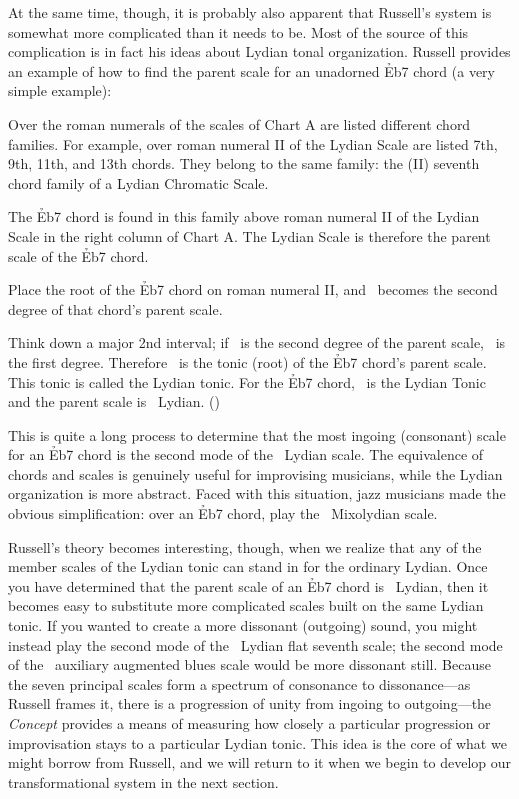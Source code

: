 At the same time, though, it is probably also apparent that Russell's system
is somewhat more complicated than it needs to be. Most of the source of this
complication is in fact his ideas about Lydian tonal organization.
Russell provides an example of how to find the parent scale for an unadorned
\h{Eb7} chord (a very simple example):
%
\begin{quoting}
  \singlespacing
  Over the roman numerals of the scales of Chart A are listed different chord
  families. For example, over roman numeral II of the Lydian Scale are listed
  7th, 9th, 11th, and 13th chords. They belong to the same family: the (II)
  seventh chord family of a Lydian Chromatic Scale.

  The \h{Eb7} chord is found in this family above roman numeral II of the
  Lydian Scale in the right column of Chart A. The Lydian Scale is therefore
  the parent scale of the \h{Eb7} chord.

  Place the root of the \h{Eb7} chord on roman numeral II, and \Eflat\ becomes
  the second degree of that chord's parent scale.

  Think down a major 2nd interval; if \Eflat\ is the second degree of the
  parent scale, \Dflat\ is the first degree. Therefore \Dflat\ is the tonic
  (root) of the \h{Eb7} chord's parent scale. This tonic is called the Lydian
  tonic. For the \h{Eb7} chord, \Dflat\ is the Lydian Tonic and the parent
  scale is \Dflat\ Lydian. ()
\end{quoting}
%
\noindent This is quite a long process to determine that the most ingoing
(consonant) scale for an \h{Eb7} chord is the second mode of the \Dflat\
Lydian scale. The equivalence of chords and scales is genuinely useful for
improvising musicians, while the Lydian organization is more abstract. Faced
with this situation, jazz musicians made the obvious simplification: over an
\h{Eb7} chord, play the \Eflat\ Mixolydian scale.

Russell's theory becomes interesting, though, when we realize that any of the
member scales of the Lydian tonic can stand in for the ordinary Lydian. Once
you have determined that the parent scale of an \h{Eb7} chord is \Dflat\
Lydian, then it becomes easy to substitute more complicated scales built on
the same Lydian tonic. If you wanted to create a more dissonant (outgoing)
sound, you might instead play the second mode of the \Dflat\ Lydian flat
seventh scale; the second mode of the \Dflat\ auxiliary augmented blues scale
would be more dissonant still. Because the seven principal scales form a
spectrum of consonance to dissonance---as Russell frames it, there is a
progression of unity from ingoing to outgoing---the \emph{Concept} provides a
means of measuring how closely a particular progression or improvisation stays
to a particular Lydian tonic. This idea is the core of what we might borrow
from Russell, and we will return to it when we begin to develop our
transformational system in the next section.

